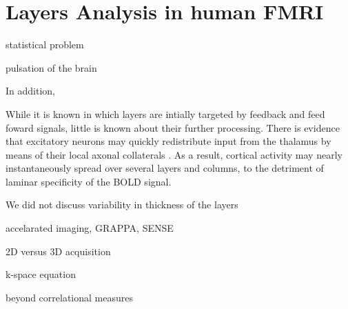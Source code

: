 \section{Layers Analysis in human FMRI}


statistical problem

pulsation of the brain 

In addition, 



While it is known in which layers are intially targeted by feedback and feed foward signals, little is known about their further processing. There is evidence that excitatory neurons may quickly redistribute input from the thalamus by means of their local axonal collaterals \cite{Guy2017,ReyesPuerta2015}. As a result, cortical activity may nearly instantaneously spread over several layers and columns, to the detriment of laminar specificity of the BOLD signal.

\cite{Maass2014}


We did not discuss variability in thickness of the layers

\cite{Heinzle}

\cite{Renzo}

accelarated imaging, GRAPPA, SENSE

2D versus 3D acquisition

k-space equation


beyond correlational measures
